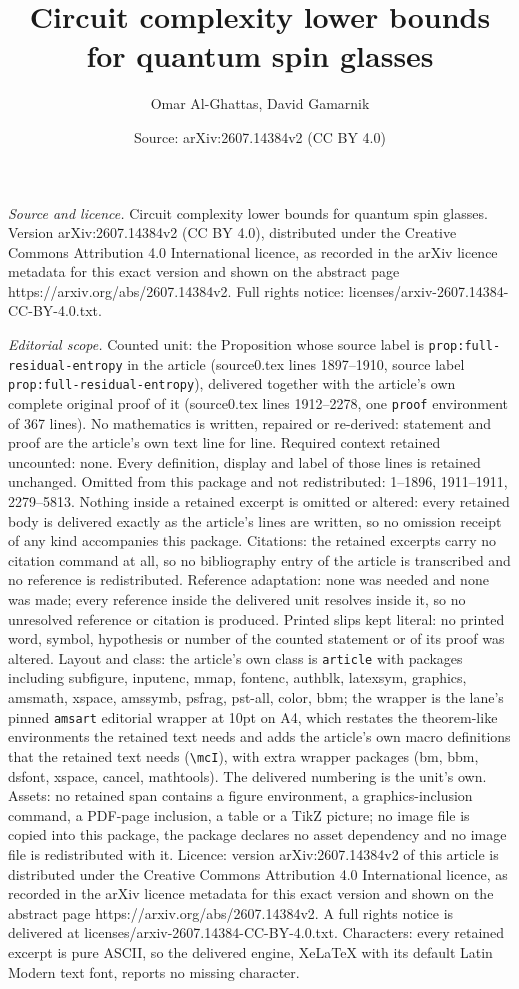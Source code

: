 \documentclass[10pt,a4paper]{amsart}
\title[Circuit complexity lower bounds for quantum spin glasses]{Circuit complexity lower bounds for quantum spin glasses}
\author{Omar Al-Ghattas, David Gamarnik}
\date{Source: arXiv:2607.14384v2 (CC BY 4.0)}
\begin{document}
\maketitle

\noindent\emph{Source and licence.} Circuit complexity lower bounds for quantum spin glasses. Version arXiv:2607.14384v2 (CC BY 4.0), distributed under the Creative Commons Attribution 4.0 International licence, as recorded in the arXiv licence metadata for this exact version and shown on the abstract page https://arxiv.org/abs/2607.14384v2. Full rights notice: licenses/arxiv-2607.14384-CC-BY-4.0.txt.\par\smallskip

\noindent\textit{Editorial scope.} Counted unit: the Proposition whose source label is \texttt{prop:full-residual-entropy} in the article (source0.tex lines 1897--1910, source label \texttt{prop:full-residual-entropy}), delivered together with the article's own complete original proof of it (source0.tex lines 1912--2278, one \texttt{proof} environment of 367 lines). No mathematics is written, repaired or re-derived: statement and proof are the article's own text line for line. Required context retained uncounted: none. Every definition, display and label of those lines is retained unchanged. Omitted from this package and not redistributed: 1--1896, 1911--1911, 2279--5813. Nothing inside a retained excerpt is omitted or altered: every retained body is delivered exactly as the article's lines are written, so no omission receipt of any kind accompanies this package. Citations: the retained excerpts carry no citation command at all, so no bibliography entry of the article is transcribed and no reference is redistributed. Reference adaptation: none was needed and none was made; every reference inside the delivered unit resolves inside it, so no unresolved reference or citation is produced. Printed slips kept literal: no printed word, symbol, hypothesis or number of the counted statement or of its proof was altered. Layout and class: the article's own class is \texttt{article} with packages including subfigure, inputenc, mmap, fontenc, authblk, latexsym, graphics, amsmath, xspace, amssymb, psfrag, pst-all, color, bbm; the wrapper is the lane's pinned \texttt{amsart} editorial wrapper at 10pt on A4, which restates the theorem-like environments the retained text needs and adds the article's own macro definitions that the retained text needs (\texttt{\textbackslash mcI}), with extra wrapper packages (bm, bbm, dsfont, xspace, cancel, mathtools). The delivered numbering is the unit's own. Assets: no retained span contains a figure environment, a graphics-inclusion command, a PDF-page inclusion, a table or a TikZ picture; no image file is copied into this package, the package declares no asset dependency and no image file is redistributed with it. Licence: version arXiv:2607.14384v2 of this article is distributed under the Creative Commons Attribution 4.0 International licence, as recorded in the arXiv licence metadata for this exact version and shown on the abstract page https://arxiv.org/abs/2607.14384v2. A full rights notice is delivered at licenses/arxiv-2607.14384-CC-BY-4.0.txt. Characters: every retained excerpt is pure ASCII, so the delivered engine, XeLaTeX with its default Latin Modern text font, reports no missing character.
\end{document}
